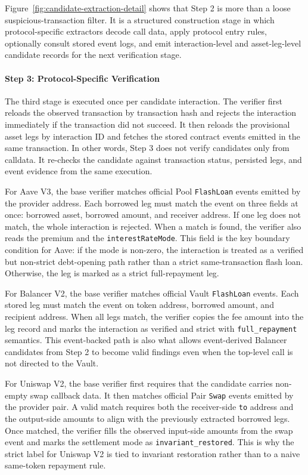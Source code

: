 Figure~\ref{fig:candidate-extraction-detail} shows that Step 2 is more than a loose suspicious-transaction filter. It is a structured construction stage in which protocol-specific extractors decode call data, apply protocol entry rules, optionally consult stored event logs, and emit interaction-level and asset-leg-level candidate records for the next verification stage.

\paragraph{Step 3: Protocol-Specific Verification}

The third stage is executed once per candidate interaction. The verifier first reloads the observed transaction by transaction hash and rejects the interaction immediately if the transaction did not succeed. It then reloads the provisional asset legs by interaction ID and fetches the stored contract events emitted in the same transaction. In other words, Step 3 does not verify candidates only from calldata. It re-checks the candidate against transaction status, persisted legs, and event evidence from the same execution.

For Aave V3, the base verifier matches official Pool \texttt{FlashLoan} events emitted by the provider address. Each borrowed leg must match the event on three fields at once: borrowed asset, borrowed amount, and receiver address. If one leg does not match, the whole interaction is rejected. When a match is found, the verifier also reads the premium and the \texttt{interestRateMode}. This field is the key boundary condition for Aave: if the mode is non-zero, the interaction is treated as a verified but non-strict debt-opening path rather than a strict same-transaction flash loan. Otherwise, the leg is marked as a strict full-repayment leg.

For Balancer V2, the base verifier matches official Vault \texttt{FlashLoan} events. Each stored leg must match the event on token address, borrowed amount, and recipient address. When all legs match, the verifier copies the fee amount into the leg record and marks the interaction as verified and strict with \texttt{full\_repayment} semantics. This event-backed path is also what allows event-derived Balancer candidates from Step 2 to become valid findings even when the top-level call is not directed to the Vault.

For Uniswap V2, the base verifier first requires that the candidate carries non-empty swap callback data. It then matches official Pair \texttt{Swap} events emitted by the provider pair. A valid match requires both the receiver-side \texttt{to} address and the output-side amounts to align with the previously extracted borrowed legs. Once matched, the verifier fills the observed input-side amounts from the swap event and marks the settlement mode as \texttt{invariant\_restored}. This is why the strict label for Uniswap V2 is tied to invariant restoration rather than to a naive same-token repayment rule.

